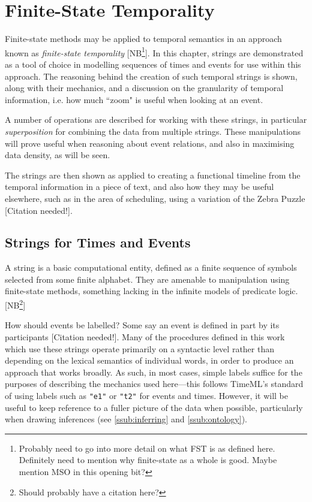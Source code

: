 \documentclass[a4paper,12pt,leqno]{article}
\newcommand{\citeneeded}[1][]{{\color{red}[Citation needed!#1]}}
\newcommand{\selfnote}[1]{{\color{red}[NB\footnote{{\color{red}#1}}]}}
\newcommand{\nb}{\selfnote}
\begin{document}
\newpage
\section{Finite-State Temporality}\label{sec:fst}
Finite-state methods may be applied to temporal semantics in an approach known as \textit{finite-state temporality} \citep{fernando2005entailments} \selfnote{Probably need to go into more detail on what FST is as defined here. Definitely need to mention why finite-state as a whole is good. Maybe mention MSO in this opening bit?}. In this chapter, strings are demonstrated as a tool of choice in modelling sequences of times and events for use within this approach. The reasoning behind the creation of such temporal strings is shown, along with their mechanics, and a discussion on the granularity of temporal information, i.e. how much ``zoom" is useful when looking at an event.

A number of operations are described for working with these strings, in particular \textit{superposition} for combining the data from multiple strings. These manipulations will prove useful when reasoning about event relations, and also in maximising data density, as will be seen.

The strings are then shown as applied to creating a functional timeline from the temporal information in a piece of text, and also how they may be useful elsewhere, such as in the area of scheduling, using a variation of the Zebra Puzzle \citeneeded{}.

\subsection{Strings for Times and Events}\label{sub:strings}
A string is a basic computational entity, defined as a finite sequence of symbols selected from some finite alphabet. They are amenable to manipulation using finite-state methods, something lacking in the infinite models of predicate logic. \nb{Should probably have a citation here?}

How should events be labelled? Some say an event is defined in part by its participants \citeneeded{}. Many of the procedures defined in this work which use these strings operate primarily on a syntactic level rather than depending on the lexical semantics of individual words, in order to produce an approach that works broadly. As such, in most cases, simple labels suffice for the purposes of describing the mechanics used here---this follows TimeML's standard of using labels such as \texttt{"e1"} or \texttt{"t2"} for events and times. However, it will be useful to keep reference to a fuller picture of the data when possible, particularly when drawing inferences (see \ref{ssub:inferring} and \ref{ssub:ontology}).
\end{document}
